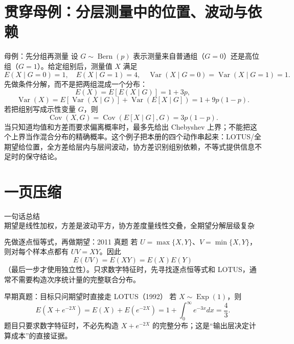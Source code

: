 \documentclass[11pt,a4paper]{ctexart}
\begin{document}
\section{贯穿母例：分层测量中的位置、波动与依赖}

\begin{examplebox}{母例：先分组再测量}
设 $G\sim\operatorname{Bern}(p)$ 表示测量来自普通组（$G=0$）还是高位组（$G=1$）。给定组别后，测量值 $X$ 满足
\[
E(X\mid G=0)=1,\quad E(X\mid G=1)=4,\quad
\operatorname{Var}(X\mid G=0)=\operatorname{Var}(X\mid G=1)=1.
\]
先做条件分解，而不是把两组混成一个分布：
\[
E(X)=E[E(X\mid G)]=1+3p,
\]
\[
\operatorname{Var}(X)=E[\operatorname{Var}(X\mid G)]
 +\operatorname{Var}(E[X\mid G])
 =1+9p(1-p).
\]
若把组别写成示性变量 $G$，则
\[
\operatorname{Cov}(X,G)=\operatorname{Cov}(E[X\mid G],G)=3p(1-p).
\]
当只知道均值和方差而要求偏离概率时，最多先给出 Chebyshev 上界；不能把这个上界当作混合分布的精确概率。这个例子把本册的四个动作串起来：LOTUS/全期望给位置，全方差给层内与层间波动，协方差识别组别依赖，不等式提供信息不足时的保守结论。
\end{examplebox}

\section{一页压缩}

\begin{corebox}{一句话总结}
\[
\boxed{\text{期望是线性加权，方差是波动平方，协方差度量线性交叠，全期望分解层级复杂性。}}
\]
\end{corebox}

\begin{examplebox}{先做逐点恒等式，再做期望：2011 真题}
若 $U=\max\{X,Y\}$、$V=\min\{X,Y\}$，则对每个样本点都有 $UV=XY$。因此
\[
E(UV)=E(XY)=E(X)E(Y)
\]
（最后一步才使用独立性）。只求数字特征时，先寻找逐点恒等式和 LOTUS，通常不需要构造次序统计量的完整联合分布。
\end{examplebox}

\begin{examplebox}{早期真题：目标只问期望时直接走 LOTUS（1992）}
若 $X\sim\operatorname{Exp}(1)$，则
\[
E(X+e^{-2X})=E(X)+E(e^{-2X})=1+\int_0^\infty e^{-3x}dx=\frac43.
\]
题目只要求数字特征时，不必先构造 $X+e^{-2X}$ 的完整分布；这是“输出层决定计算成本”的直接证据。
\end{examplebox}
\end{document}
